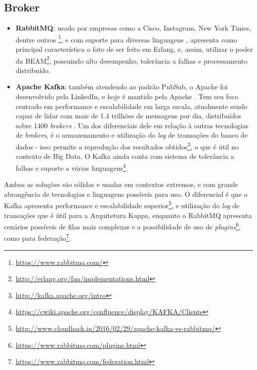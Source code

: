 \subsection{Broker}

\begin{itemize}

    \item \textbf{RabbitMQ}: usado por empresas como a Cisco, Instagram,
        New York Times, dentre outros \footnote{\url{https://www.rabbitmq.com/}},
        e com suporte para diversas linguagens \cite{zaitsev2014}, apresenta
        como principal característica o fato de ser feito em Erlang, e, assim,
        utilizar o poder da
        BEAM\footnote{\url{http://erlang.org/faq/implementations.html}},
        possuindo alto desempenho, tolerância a falhas e processamento
        distribuído.

    \item \textbf{Apache Kafka}: também atendendo ao padrão PubSub, o Apache
        foi desenvolvido pela LinkedIn, e hoje é mantido pela Apache
        \cite{koshy2016}. Tem seu foco centrado em performance e escalabilidade
        em larga escala, atualmente sendo capaz de lidar com mais de 1.4
        trilhões de mensagens por dia, distribuídos sobre 1400
        \textit{brokers} \cite{koshy2016}. Um dos diferenciais dele em relação
        à outras tecnologias de \textit{brokers}, é o armazenamento e
        utilização do \textit{log} de transações do banco de dados - isso
        permite a reprodução dos resultados
        obtidos\footnote{\url{http://kafka.apache.org/intro}}, o que é útil no
        contexto de Big Data. O Kafka ainda conta com sistema de tolerância
        a falhas e suporte a várias
        linguagens\footnote{\url{https://cwiki.apache.org/confluence/display/KAFKA/Clients}}.

\end{itemize}

Ambas as soluções são sólidas e usadas em contextos extremos, e com grande
abrangência de tecnologias e linguagens possíveis para uso. O diferencial é que
o Kafka apresenta performance e escalabilidade
superior\footnote{\url{http://www.cloudhack.in/2016/02/29/apache-kafka-vs-rabbitmq/}},
e utilização do \textit{log} de transações que é útil para a Arquitetura Kappa,
enquanto o RabbitMQ apresenta cenários possíveis de filas mais complexas e a
possibilidade de uso de
\textit{plugins}\footnote{\url{https://www.rabbitmq.com/plugins.html}},
como para federação\footnote{\url{https://www.rabbitmq.com/federation.html}}.


